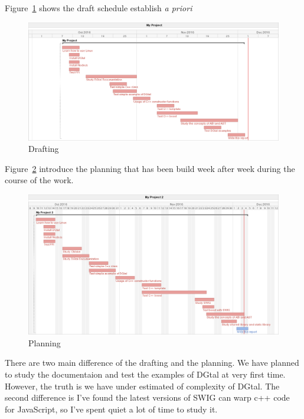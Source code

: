 
Figure~\ref{fig:Drafting} shows the draft schedule establish \emph{a priori}

\begin{figure}
   \centering
      
  \includegraphics[scale=0.5]{Images/Gantt1.png}
  
   \caption{Drafting}
   \label{fig:Drafting}
\end{figure}

Figure~\ref{fig:Planning} introduce the planning that has been build week after week during the course of the work.

\begin{figure}
   \centering
      \includegraphics[scale=0.5]{Images/Gantt2.png}
   \caption{Planning}
   \label{fig:Planning}
\end{figure}

There are two main difference of the drafting and the planning. We have planned to study the documentaion and test the examples of DGtal at very first time. However, the truth is we have under estimated of complexity of DGtal. The second difference is I've found the latest versions of SWIG can  warp c++ code for JavaScript, so I've spent quiet a lot of time to study it. 

